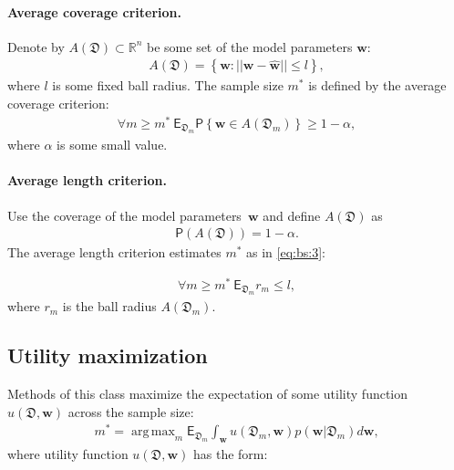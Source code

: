 \documentclass[
11pt,%
tightenlines,%
twoside,%
onecolumn,%
nofloats,%
nobibnotes,%
nofootinbib,%
superscriptaddress,%
noshowpacs,%
centertags]%
{revtex4}
\DeclareMathOperator*{\argmax}{arg\,max}
\begin{document}
\paragraph{Average coverage criterion.}
Denote by $A\left(\mathfrak{D}\right) \subset \mathbb{R}^n$ be some set of the model parameters $\textbf{w}$:
\begin{equation}
\label{eq:bs:2}
\begin{aligned}
	A\left(\mathfrak{D}\right) = \left\{\textbf{w}:||\textbf{w} - \hat{\textbf{w}}||\leq l\right\},
\end{aligned}
\end{equation}
where $l$ is some fixed ball radius.
The sample size $m^*$ is defined by the average coverage criterion:
\begin{equation}
\label{eq:bs:3}
\begin{aligned}
	\forall m \geq m^*  ~ \mathsf{E}_{\mathfrak{D}_m}\mathsf{P}\left\{\textbf{w} \in A\left(\mathfrak{D}_m\right)\right\} \geq 1-\alpha,
\end{aligned}
\end{equation}
where $\alpha$ is some small value.
	
\paragraph{Average length criterion.}
Use the coverage of the model parameters~$\textbf{w}$ and define $A\left(\mathfrak{D}\right)$ as
\begin{equation}
\label{eq:bs:4}
\begin{aligned}
	\mathsf{P}\left(A\left(\mathfrak{D}\right)\right) =  1- \alpha.
\end{aligned}
\end{equation}
The average length criterion estimates  $m^*$ as in \eqref{eq:bs:3}:
	
\begin{equation}
\label{eq:bs:5}
\begin{aligned}
	\forall m \geq m^*  ~ \mathsf{E}_{\mathfrak{D}_m}r_m\leq l,
\end{aligned}
\end{equation}
where $r_m$ is the ball radius $A\left(\mathfrak{D}_{m}\right)$.

\subsection{Utility maximization}
Methods of this class maximize the expectation of some utility function $u\left(\mathfrak{D}, \textbf{w}\right)$ across the sample size:
\begin{equation}
\label{eq:bs:6}
\begin{aligned}
	m^* = \argmax_{m} \mathsf{E}_{\mathfrak{D}_m}\int_{\textbf{w}}u\left(\mathfrak{D}_m, \textbf{w}\right)p(\textbf{w}|\mathfrak{D}_m)d\textbf{w},
\end{aligned}
\end{equation}
where utility function $u\left(\mathfrak{D}, \textbf{w}\right)$ has the form:
\end{document}
